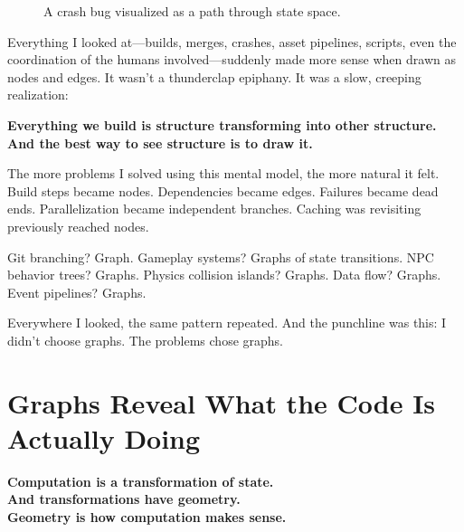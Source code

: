 \begin{figure}[h]
    \centering

    \caption{A crash bug visualized as a path through state space.}
\end{figure}

Everything I looked at—builds, merges, crashes, asset pipelines, scripts, even the coordination of the humans involved—suddenly made more sense when drawn as nodes and edges. It wasn't a thunderclap epiphany. It was a slow, creeping realization:

\textbf{Everything we build is structure transforming into other structure. And the best way to see structure is to draw it.}

The more problems I solved using this mental model, the more natural it felt. Build steps became nodes. Dependencies became edges. Failures became dead ends. Parallelization became independent branches. Caching was revisiting previously reached nodes.

Git branching? Graph.  
Gameplay systems? Graphs of state transitions.  
NPC behavior trees? Graphs.  
Physics collision islands? Graphs.  
Data flow? Graphs.  
Event pipelines? Graphs.  

Everywhere I looked, the same pattern repeated. And the punchline was this: I didn't choose graphs. The problems chose graphs.

\section{Graphs Reveal What the Code Is Actually Doing}
\label{sec:graphs-reveal}

\begin{center}
{\LARGE\bfseries Computation is a transformation of state.}\\[6pt]
{\Large\bfseries And transformations have geometry.}\\[6pt]
{\large\bfseries Geometry is how computation makes sense.}
\end{center}


